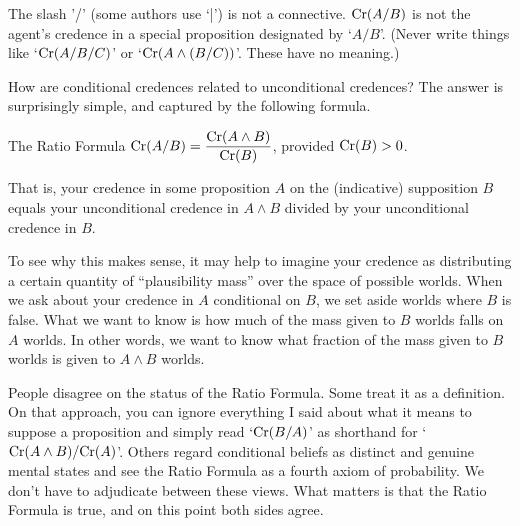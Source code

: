 The slash '/' (some authors use `|') is not a connective. $\text{Cr}(A/B)$ is not the
agent's credence in a special proposition designated by `$A/B$'. (Never write
things like `$\text{Cr}(A/B/C)$' or `$\text{Cr}(A \land (B/C))$'. These have no meaning.)


How are conditional credences related to unconditional credences?
The answer is surprisingly simple, and captured by the following
formula.
\begin{genericthm}{The Ratio Formula}
  \quad\newline
  $\text{Cr}(A/B) = \dfrac{\text{Cr}(A \land B)}{\text{Cr}(B)}$, provided $\text{Cr}(B)>0$.
\end{genericthm}
That is, your credence in some proposition $A$ on the (indicative) supposition
$B$ equals your unconditional credence in $A \land B$ divided by your
unconditional credence in $B$.

To see why this makes sense, it may help to imagine your credence as
distributing a certain quantity of ``plausibility mass'' over
the space of possible worlds. When we ask about your credence in
$A$ conditional on $B$, we set aside worlds where $B$ is false. What
we want to know is how much of the mass given to $B$ worlds falls on
$A$ worlds. In other words, we want to know what fraction of the mass
given to $B$ worlds is given to $A \land B$ worlds.

People disagree on the status of the Ratio Formula. Some treat it as a
definition. On that approach, you can ignore everything I said about
what it means to suppose a proposition and simply read `$\text{Cr}(B/A)$' as
shorthand for `$\text{Cr}(A \land B)/\text{Cr}(A)$'. Others regard conditional
beliefs as distinct and genuine mental states and see the Ratio
Formula as a fourth axiom of probability. We
don't have to adjudicate between these views. What matters is that the
Ratio Formula is true, and on this point both sides agree.

